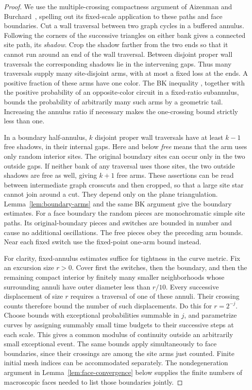 \begin{proof}
We use the multiple-crossing compactness argument of
Aizenman and Burchard~\cite{aizenmanburchard99}, spelling out its
fixed-scale application to these paths and face boundaries.
Cut a wall traversal between two graph cycles in a buffered annulus.
Following the corners of the successive triangles on either bank gives
a connected site path, its \emph{shadow}.  Crop the shadow farther from
the two ends so that it cannot run around an end of the wall traversal.
Between disjoint proper wall traversals the corresponding shadows lie
in the intervening gaps.  Thus many traversals supply many site-disjoint
arms, with at most a fixed loss at the ends.  A positive fraction of
these arms have one color.  The BK inequality
\cite[Theorem~3.3]{vandenbergkesten85}, together with the
positive probability of an opposite-color circuit in a fixed-ratio
subannulus, bounds the probability of arbitrarily many such arms by a
geometric tail.  Increasing the annulus ratio if necessary makes the
one-crossing bound strictly less than one.

In a boundary half-annulus, $k$ disjoint proper wall traversals have at
least $k-1$ free shadows, in their internal gaps.  Here and below
\emph{free} means that the arm uses only random interior sites.  The
original boundary sites can occur only in the two outside gaps.  If
neither bank of any traversal uses those sites, the two outside shadows
are free as well, giving $k+1$ free arms.  These assertions can be read
between intermediate graph crosscuts and then cropped, so that a large
site star cannot join around a cut.  They depend only on the plane
triangulation.  Lemma~\ref{lem:boundary-arms} and the same BK argument
give the boundary estimates.  For a face boundary the random pieces
are monochromatic simple site paths.  Its original-boundary pieces and
switches are bounded in number and cause no additional oscillations.
The free pieces obey the preceding arm bounds.  Near each fixed switch
use the fixed-point one-arm bound instead.

For clarity, fixed-annulus estimates suffice for tightness in the
curve metric.  Fix an excursion size $r>0$.  Cover first the switches,
then the boundary, and then the remaining compact interior by finitely
many smaller neighborhoods whose surrounding annuli have outer
diameter less than $r/10$.  Every successive displacement of size $r$
requires a traversal of one of these annuli.  Their crossing counts
therefore bound the number of such displacements.  Do this for
$r=2^{-j}$.  Choose bounds with exceptional probabilities summable in
$j$, and parametrize curves by assigning summably small time budgets
to their successive steps at each scale.  This gives a common modulus
of continuity outside an arbitrarily small exceptional event.  The
same bounds apply simultaneously to face boundaries, since their
crossings are among the site arms just counted.  Finite initial mesh
indices can be accommodated separately.  The nondegeneration argument
in Lemma~\ref{lem:face-convergence} below supplies the finite numbers of
macroscopic faces needed to list those boundaries jointly.
\end{proof}

